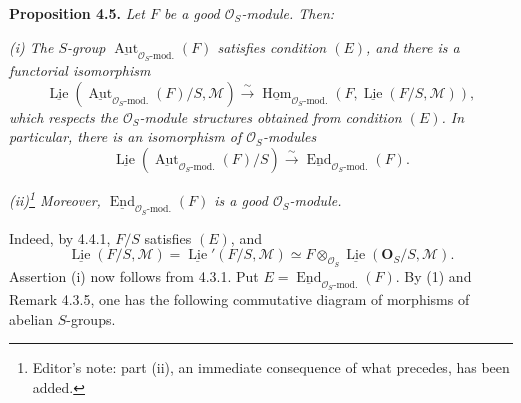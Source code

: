 
\setcounter{footnote}{70}

\medskip
\noindent\textbf{Proposition 4.5.}
\textit{Let \(F\) be a good \(\mathcal O_S\)-module. Then:}

\textit{(i) The \(S\)-group
\(\underline{\operatorname{Aut}}_{\mathcal O_S\text{-mod.}}(F)\)
satisfies condition \((E)\), and there is a functorial isomorphism}
\[
 \underline{\operatorname{Lie}}\!
   \left(\underline{\operatorname{Aut}}_{\mathcal O_S\text{-mod.}}(F)/S,
         \mathcal M\right)
 \xrightarrow{\sim}
 \underline{\operatorname{Hom}}_{\mathcal O_S\text{-mod.}}
   \left(F,\underline{\operatorname{Lie}}(F/S,\mathcal M)\right),
\]
\textit{which respects the \(\mathcal O_S\)-module structures obtained from
condition \((E)\). In particular, there is an isomorphism of
\(\mathcal O_S\)-modules}
\[
 \underline{\operatorname{Lie}}\!
   \left(\underline{\operatorname{Aut}}_{\mathcal O_S\text{-mod.}}(F)/S\right)
 \xrightarrow{\sim}
 \underline{\operatorname{End}}_{\mathcal O_S\text{-mod.}}(F).
\]

\textit{(ii)\footnote{Editor's note: part (ii), an immediate consequence
of what precedes, has been added.} Moreover,
\(\underline{\operatorname{End}}_{\mathcal O_S\text{-mod.}}(F)\)
is a good \(\mathcal O_S\)-module.}

Indeed, by 4.4.1, \(F/S\) satisfies \((E)\), and
\begin{equation*}
 \underline{\operatorname{Lie}}(F/S,\mathcal M)
 =\underline{\operatorname{Lie}}'(F/S,\mathcal M)
 \simeq
 F\otimes_{\mathcal O_S}
 \underline{\operatorname{Lie}}(\mathbf O_S/S,\mathcal M).
 \tag{1}
\end{equation*}
Assertion (i) now follows from 4.3.1. Put
\(E=\underline{\operatorname{End}}_{\mathcal O_S\text{-mod.}}(F)\).
By (1) and Remark 4.3.5, one has the following commutative diagram of
morphisms of abelian \(S\)-groups.

